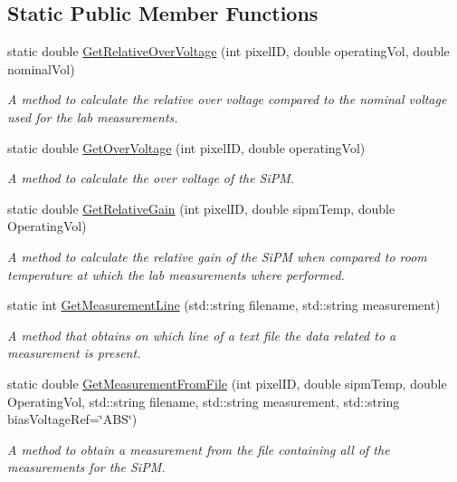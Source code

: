 \subsection*{Static Public Member Functions}
\begin{DoxyCompactItemize}
\item 
static double \hyperlink{classICalibration_a42508d0371c83992228e8fe8f0fe9abc}{Get\+Relative\+Over\+Voltage} (int pixel\+ID, double operating\+Vol, double nominal\+Vol)
\begin{DoxyCompactList}\small\item\em A method to calculate the relative over voltage compared to the nominal voltage used for the lab measurements. \end{DoxyCompactList}\item 
static double \hyperlink{classICalibration_abf475c05f96c8431e2a929eb330f2c1c}{Get\+Over\+Voltage} (int pixel\+ID, double operating\+Vol)
\begin{DoxyCompactList}\small\item\em A method to calculate the over voltage of the Si\+PM. \end{DoxyCompactList}\item 
static double \hyperlink{classICalibration_ac30326a45d0d7e63e4b62054d9289b89}{Get\+Relative\+Gain} (int pixel\+ID, double sipm\+Temp, double Operating\+Vol)
\begin{DoxyCompactList}\small\item\em A method to calculate the relative gain of the Si\+PM when compared to room temperature at which the lab measurements where performed. \end{DoxyCompactList}\item 
static int \hyperlink{classICalibration_a702b4ec0056e3c1afc66f27c9b85a499}{Get\+Measurement\+Line} (std\+::string filename, std\+::string measurement)
\begin{DoxyCompactList}\small\item\em A method that obtains on which line of a text file the data related to a measurement is present. \end{DoxyCompactList}\item 
static double \hyperlink{classICalibration_accaa04857537b7774657e76f4b67cbda}{Get\+Measurement\+From\+File} (int pixel\+ID, double sipm\+Temp, double Operating\+Vol, std\+::string filename, std\+::string measurement, std\+::string bias\+Voltage\+Ref=\char`\"{}A\+BS\char`\"{})
\begin{DoxyCompactList}\small\item\em A method to obtain a measurement from the file containing all of the measurements for the Si\+PM. \end{DoxyCompactList}\end{DoxyCompactItemize}
